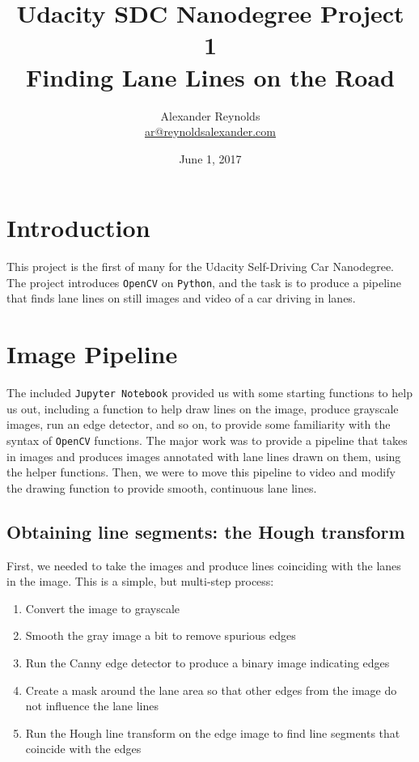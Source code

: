 \documentclass{article}
\title{Udacity SDC Nanodegree Project 1\\
Finding Lane Lines on the Road}
\author{Alexander Reynolds\\
    \href{mailto:ar@reynoldsalexander.com}{ar@reynoldsalexander.com}}
\date{June 1, 2017}
\newcommand{\code}{\texttt}
\begin{document}
\maketitle

\section{Introduction}

This project is the first of many for the Udacity Self-Driving Car Nanodegree. The project introduces \code{OpenCV} on \code{Python}, and the task is to produce a pipeline that finds lane lines on still images and video of a car driving in lanes.


\section{Image Pipeline}

The included \code{Jupyter Notebook} provided us with some starting functions to help us out, including a function to help draw lines on the image, produce grayscale images, run an edge detector, and so on, to provide some familiarity with the syntax of \code{OpenCV} functions. The major work was to provide a pipeline that takes in images and produces images annotated with lane lines drawn on them, using the helper functions. Then, we were to move this pipeline to video and modify the drawing function to provide smooth, continuous lane lines. 

\subsection{Obtaining line segments: the Hough transform}

First, we needed to take the images and produce lines coinciding with the lanes in the image. This is a simple, but multi-step process: 

\begin{enumerate}[nolistsep]
    \item Convert the image to grayscale
    \item Smooth the gray image a bit to remove spurious edges
    \item Run the Canny edge detector to produce a binary image indicating edges
    \item Create a mask around the lane area so that other edges from the image do not influence the lane lines
    \item Run the Hough line transform on the edge image to find line segments that coincide with the edges
\end{enumerate}
\end{document}

